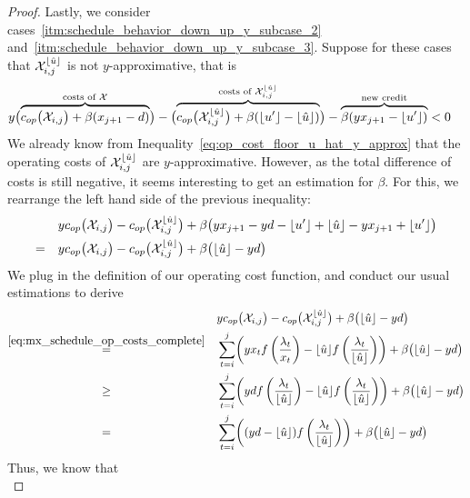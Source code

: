 \begin{proof}
Lastly, we consider cases~\ref{itm:schedule_behavior_down_up_y_subcase_2} and~\ref{itm:schedule_behavior_down_up_y_subcase_3}. Suppose for these cases that $\mathcal{X}_{i,j}^{\lfloor\hat{u}\rfloor}$ is not $y$-approxi\-mative, that is
\begin{align*}
	y\bigl(\overbrace{c_{op}\bigl(\mathcal{X}_{i,j}\bigr)+\beta(x_{j+1}-d)}^{\text{costs of }\mathcal{X}}\bigr)&-\bigl(\overbrace{c_{op}\bigl(\mathcal{X}_{i,j}^{\lfloor\hat{u}\rfloor}\bigr)+\beta(\lfloor u'\rfloor-\lfloor\hat{u}\rfloor)}^{\text{costs of }\mathcal{X}_{i,j}^{\lfloor\hat{u}\rfloor}}\bigr)-\overbrace{\beta(yx_{j+1}-\lfloor u'\rfloor)}^{\text{new credit}}<0
\end{align*}
We already know from Inequality~\eqref{eq:op_cost_floor_u_hat_y_approx} that the operating costs of $\mathcal{X}_{i,j}^{\lfloor\hat{u}\rfloor}$ are $y$-approximative. However, as the total difference of costs is still negative, it seems interesting to get an estimation for $\beta$. For this, we rearrange the left hand side of the previous inequality:
\begin{align*}
	&yc_{op}\bigl(\mathcal{X}_{i,j}\bigr)-c_{op}\bigl(\mathcal{X}_{i,j}^{\lfloor\hat{u}\rfloor}\bigr)+\beta\bigl(yx_{j+1}-yd-\lfloor u'\rfloor+\lfloor\hat{u}\rfloor-yx_{j+1}+\lfloor u'\rfloor\bigr)\\
	=\quad&yc_{op}\bigl(\mathcal{X}_{i,j}\bigr)-c_{op}\bigl(\mathcal{X}_{i,j}^{\lfloor\hat{u}\rfloor}\bigr)+\beta\bigl(\lfloor\hat{u}\rfloor-yd\bigr)
\end{align*}
We plug in the definition of our operating cost function, and conduct our usual estimations to derive
\begin{align*}
	&y\opcosts\bigl(\mx_{i,j}\bigr)-\opcosts\bigl(\mx_{i,j}^{\floor{\hat{u}}}\bigr)+\beta\bigl(\floor{\hat{u}}-yd\bigr)\\
	\stackrel{\eqref{eq:mx_schedule_op_costs_complete}}{=}\quad&\sum\limits_{t=i}^{j}\biggl(yx_tf\left(\frac{\lambda_t}{x_t}\right)-\floor{\hat{u}}f\left(\frac{\lambda_t}{\floor{\hat{u}}}\right)\biggr)+\beta\bigl(\floor{\hat{u}}-yd\bigr)\\
	\stackrel{\phantom{\eqref{eq:mx_schedule_op_costs_complete}}}{\ge}\quad&\sum\limits_{t=i}^{j}\biggl(yd\*f\left(\frac{\lambda_t}{\floor{\hat{u}}}\right)-\floor{\hat{u}}f\left(\frac{\lambda_t}{\floor{\hat{u}}}\right)\biggr)+\beta\bigl(\floor{\hat{u}}-yd\bigr)\\
	\stackrel{\phantom{\eqref{eq:mx_schedule_op_costs_complete}}}{=}\quad&\sum\limits_{t=i}^{j}\biggl((yd-\floor{\hat{u}})f\left(\frac{\lambda_t}{\floor{\hat{u}}}\right)\biggr)+\beta\bigl(\floor{\hat{u}}-yd\bigr)
\end{align*}
Thus, we know that
\begin{equation*}

\end{equation*}
\end{proof}
